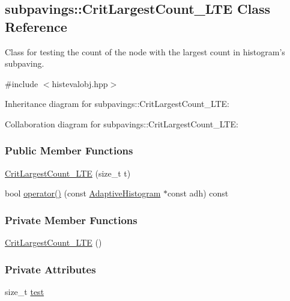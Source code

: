 \hypertarget{classsubpavings_1_1CritLargestCount__LTE}{\subsection{subpavings\-:\-:\-Crit\-Largest\-Count\-\_\-\-L\-T\-E \-Class \-Reference}
\label{classsubpavings_1_1CritLargestCount__LTE}
}


\-Class for testing the count of the node with the largest count in histogram's subpaving.  




{\ttfamily \#include $<$histevalobj.\-hpp$>$}



\-Inheritance diagram for subpavings\-:\-:\-Crit\-Largest\-Count\-\_\-\-L\-T\-E\-:


\-Collaboration diagram for subpavings\-:\-:\-Crit\-Largest\-Count\-\_\-\-L\-T\-E\-:
\subsubsection*{\-Public \-Member \-Functions}
\begin{DoxyCompactItemize}
\item 
\hyperlink{classsubpavings_1_1CritLargestCount__LTE_abcfc1d39ab65522211002e379937dba7}{\-Crit\-Largest\-Count\-\_\-\-L\-T\-E} (size\-\_\-t t)
\item 
bool \hyperlink{classsubpavings_1_1CritLargestCount__LTE_a5b49847102d683709b9f4dbea40ff4a8}{operator()} (const \hyperlink{classsubpavings_1_1AdaptiveHistogram}{\-Adaptive\-Histogram} $\ast$const adh) const 
\end{DoxyCompactItemize}
\subsubsection*{\-Private \-Member \-Functions}
\begin{DoxyCompactItemize}
\item 
\hyperlink{classsubpavings_1_1CritLargestCount__LTE_a0375fdc205ef93338f708f9b6cc95a64}{\-Crit\-Largest\-Count\-\_\-\-L\-T\-E} ()
\end{DoxyCompactItemize}
\subsubsection*{\-Private \-Attributes}
\begin{DoxyCompactItemize}
\item 
size\-\_\-t \hyperlink{classsubpavings_1_1CritLargestCount__LTE_a3d345e059a93bb8d79dd0f54f6a194e3}{test}
\end{DoxyCompactItemize}


